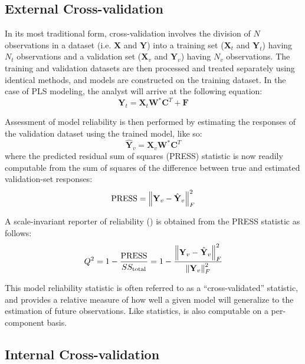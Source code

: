 \subsection{External Cross-validation}

\begin{doublespace}
In its most traditional form, cross-validation involves the division of $N$
observations in a dataset (i.e. $\mathbf{X}$ and $\mathbf{Y}$) into a training
set ($\mathbf{X}_t$ and $\mathbf{Y}_t$) having $N_t$ observations and a
validation set ($\mathbf{X}_v$ and $\mathbf{Y}_v$) having $N_v$ observations.
The training and validation datasets are then processed and treated separately
using identical methods, and models are constructed on the training dataset.
In the case of PLS modeling, the analyst will arrive at the following equation:
\begin{equation}
\mathbf{Y}_t = \mathbf{X}_t \mathbf{W}^\ast \mathbf{C}^T + \mathbf{F}
\end{equation}

Assessment of model reliability is then performed by estimating the responses
of the validation dataset using the trained model, like so:
\begin{equation}
\hat{\mathbf{Y}}_v = \mathbf{X}_v \mathbf{W}^\ast \mathbf{C}^T
\end{equation}
where the predicted residual sum of squares (PRESS) statistic is now readily
computable from the sum of squares of the difference between true and estimated
validation-set responses:
\begin{equation}
\mathrm{PRESS} = \left\| \mathbf{Y}_v - \hat{\mathbf{Y}}_v \right\|_F^2
\end{equation}

A scale-invariant reporter of reliability (\qsq{}) is obtained from the PRESS
statistic as follows:
\begin{equation}
Q^2
 = 1 - \frac{\mathrm{PRESS}}{SS_{\mathrm{total}}{}}
 = 1 - \frac{\left\| \mathbf{Y}_v - \hat{\mathbf{Y}}_v \right\|_F^2}{\left\| \mathbf{Y}_v \right\|_F^2}
\end{equation}

This model reliability statistic is often referred to as a ``cross-validated''
\rsq{} statistic, and provides a relative measure of how well a given model
will generalize to the estimation of future observations. Like \rsq{}
statistics, \qsq{} is also computable on a per-component basis.
\end{doublespace}

\subsection{Internal Cross-validation}


